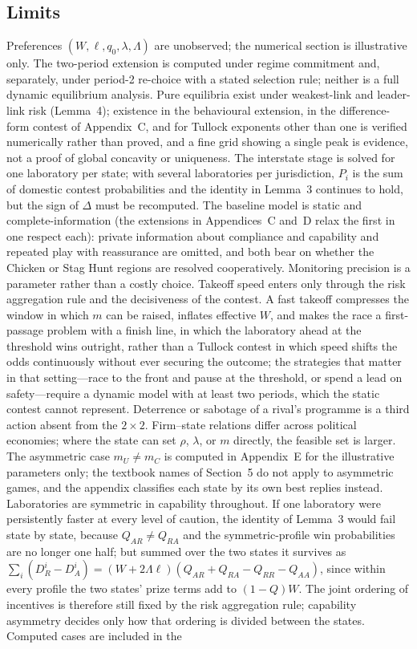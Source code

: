 \documentclass[11pt]{article}
\theoremstyle{plain}
\theoremstyle{definition}
\theoremstyle{remark}
\newcommand{\Lam}{\Lambda}
\newcommand{\Delt}{\Delta}
\begin{document}
\subsection{Limits}

Preferences $(W,\ell,q_0,\lambda,\Lam)$ are unobserved; the numerical section is illustrative only. The two-period extension is computed under regime commitment and, separately, under period-2 re-choice with a stated selection rule; neither is a full dynamic equilibrium analysis. Pure equilibria exist under weakest-link and leader-link risk (Lemma~4); existence in the behavioural extension, in the difference-form contest of Appendix~C, and for Tullock exponents other than one is verified numerically rather than proved, and a fine grid showing a single peak is evidence, not a proof of global concavity or uniqueness. The interstate stage is solved for one laboratory per state; with several laboratories per jurisdiction, $P_i$ is the sum of domestic contest probabilities and the identity in Lemma~3 continues to hold, but the sign of $\Delt$ must be recomputed. The baseline model is static and complete-information (the extensions in Appendices~C and~D relax the first in one respect each): private information about compliance and capability \citep{fearon1995,emery2024} and repeated play with reassurance \citep{kydd2005} are omitted, and both bear on whether the Chicken or Stag Hunt regions are resolved cooperatively. Monitoring precision is a parameter rather than a costly choice. Takeoff speed enters only through the risk aggregation rule and the decisiveness of the contest. A fast takeoff compresses the window in which $m$ can be raised, inflates effective $W$, and makes the race a first-passage problem with a finish line, in which the laboratory ahead at the threshold wins outright, rather than a Tullock contest in which speed shifts the odds continuously without ever securing the outcome; the strategies that matter in that setting---race to the front and pause at the threshold, or spend a lead on safety---require a dynamic model with at least two periods, which the static contest cannot represent. Deterrence or sabotage of a rival's programme \citep{hendrycks2025} is a third action absent from the $2\times2$. Firm--state relations differ across political economies; where the state can set $\rho$, $\lambda$, or $m$ directly, the feasible set is larger. The asymmetric case $m_U\neq m_C$ is computed in Appendix~E for the illustrative parameters only; the textbook names of Section~5 do not apply to asymmetric games, and the appendix classifies each state by its own best replies instead. Laboratories are symmetric in capability throughout. If one laboratory were persistently faster at every level of caution, the identity of Lemma~3 would fail state by state, because $Q_{AR}\neq Q_{RA}$ and the symmetric-profile win probabilities are no longer one half; but summed over the two states it survives as $\sum_i(D^i_R-D^i_A)=(W+2\Lam\ell)(Q_{AR}+Q_{RA}-Q_{RR}-Q_{AA})$, since within every profile the two states' prize terms add to $(1-Q)W$. The joint ordering of incentives is therefore still fixed by the risk aggregation rule; capability asymmetry decides only how that ordering is divided between the states. Computed cases are included in the 
\end{document}
